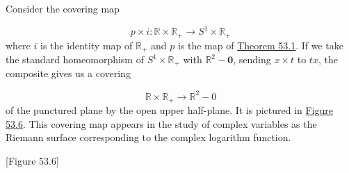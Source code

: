 \begin{centeredblock*}
\begin{example}
\label{ex:\thesection.\theexample}
Consider the covering map

\[
p \times i : \mathbb{R} \times {\mathbb{R}}_{ + } \rightarrow {S}^{1} \times {\mathbb{R}}_{ + }
\]
where \(i\) is the identity map of \(\mathbb{R}_{ + }\) and \(p\) is the map of \hyperref[thm:53.1]{Theorem 53.1}. If we take the standard homeomorphism of \(S^{1} \times {\mathbb{R}}_{ + }\) with \(\mathbb{R}^{2} - \mathbf{0}\), sending \(x \times t\) to \({tx}\), the composite gives us a covering

\[
\mathbb{R} \times {\mathbb{R}}_{ + } \rightarrow {\mathbb{R}}^{2} - 0
\]
of the punctured plane by the open upper half-plane. It is pictured in \hyperref[fig:53.6]{Figure 53.6}. This covering map appears in the study of complex variables as the Riemann surface corresponding to the complex logarithm function.

[Figure 53.6]
\end{example}
\end{centeredblock*}


